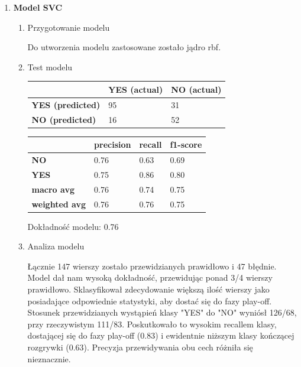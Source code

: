 \documentclass{article}
\begin{document}
\begin{enumerate}
    \item \textbf{Model SVC}
    \begin{enumerate}
        \item Przygotowanie modelu

        Do utworzenia modelu zastosowane zostało jądro rbf. 
        
        \item Test modelu

        \begin{table}[H]
            \centering
            \begin{tabular}{|l|l|l|}
            \hline
             & \textbf{YES (actual)} & \textbf{NO (actual)}  \\ \hline
            \textbf{YES (predicted)} & 95 & 31 \\ \hline
            \textbf{NO (predicted)} & 16 & 52  \\ \hline
            \end{tabular}
        \end{table}
        
        \begin{table}[H]
            \centering
            \begin{tabular}{|l|l|l|l|}
            \hline
            & \textbf{precision} & \textbf{recall} & \textbf{f1-score}  \\ \hline
            \textbf{NO} & 0.76 & 0.63 & 0.69 \\ \hline
            \textbf{YES} & 0.75 & 0.86 & 0.80 \\ \hline
            \textbf{macro avg} & 0.76 & 0.74 & 0.75 \\ \hline
            \textbf{weighted avg} & 0.76 & 0.76 & 0.75 \\ \hline
            \end{tabular}
        \end{table}
        Dokładność modelu: 0.76
        \item Analiza modelu
        
        Łącznie 147 wierszy zostało przewidzianych prawidłowo i 47 błędnie. Model dał nam wysoką dokładność, przewidując ponad 3/4 wierszy prawidłowo. Sklasyfikował zdecydowanie większą ilość wierszy jako posiadające odpowiednie statystyki, aby dostać się do fazy play-off. Stosunek przewidzianych wystąpień klasy "YES" do "NO" wyniósł 126/68, przy rzeczywistym 111/83. Poskutkowało to wysokim recallem klasy, dostającej się do fazy play-off (0.83) i ewidentnie niższym klasy kończącej rozgrywki (0.63). Precyzja przewidywania obu cech różniła się nieznacznie.
        


\end{enumerate}
\end{enumerate}
\end{document}
